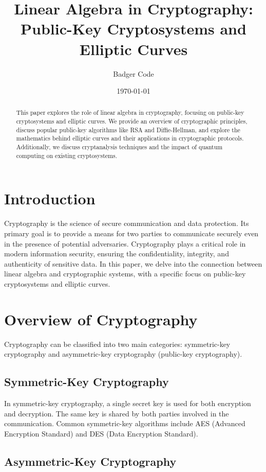 \documentclass{article}
\title{Linear Algebra in Cryptography: Public-Key Cryptosystems and Elliptic Curves}
\author{Badger Code}
\date{\today}
\begin{document}
\maketitle

\begin{abstract}
    This paper explores the role of linear algebra in cryptography, focusing on public-key cryptosystems and elliptic curves. We provide an overview of cryptographic principles, discuss popular public-key algorithms like RSA and Diffie-Hellman, and explore the mathematics behind elliptic curves and their applications in cryptographic protocols. Additionally, we discuss cryptanalysis techniques and the impact of quantum computing on existing cryptosystems.
\end{abstract}

\section{Introduction}

Cryptography is the science of secure communication and data protection. Its primary goal is to provide a means for two parties to communicate securely even in the presence of potential adversaries. Cryptography plays a critical role in modern information security, ensuring the confidentiality, integrity, and authenticity of sensitive data. In this paper, we delve into the connection between linear algebra and cryptographic systems, with a specific focus on public-key cryptosystems and elliptic curves.

\section{Overview of Cryptography}

Cryptography can be classified into two main categories: symmetric-key cryptography and asymmetric-key cryptography (public-key cryptography).

\subsection{Symmetric-Key Cryptography}

In symmetric-key cryptography, a single secret key is used for both encryption and decryption. The same key is shared by both parties involved in the communication. Common symmetric-key algorithms include AES (Advanced Encryption Standard) and DES (Data Encryption Standard).

\subsection{Asymmetric-Key Cryptography}
\end{document}
